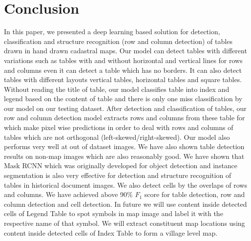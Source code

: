 \section{Conclusion}
\label{conclusion}
In this paper, we presented a deep learning based solution for detection, classification and structure recognition (row and column detection) of tables drawn in hand drawn cadastral maps. Our model can detect tables with different variations such as tables with and without horizontal and vertical lines for rows and columns even it can detect a table which has no borders. It can also detect tables with different layouts vertical tables, horizontal tables and square tables. Without reading the title of table, our model classifies table into index and legend based on the content of table and there is only one miss classification by our model on our testing dataset. After detection and classification of tables, our row and column detection model extracts rows and columns from these table for which make pixel wise predictions in order to deal with rows and columns of tables which are not orthogonal (left-skewed/right-skewed). Our model also performs very well at out of dataset images. We have also shown table detection results on non-map images which are also reasonably good. We have shown that Mask RCNN which was originally developed for object detection and instance segmentation is also very effective for detection and structure recognition of tables in historical document images. We also detect cells by the overlaps of rows and columns. We have achieved above 90\% $F_1$ score for table detection, row and column detection and cell detection. In future we will use content inside detected cells of Legend Table to spot symbols in map image and label it with the respective name of that symbol. We will extract constituent map locations using content inside detected cells of Index Table to form a village level map.

